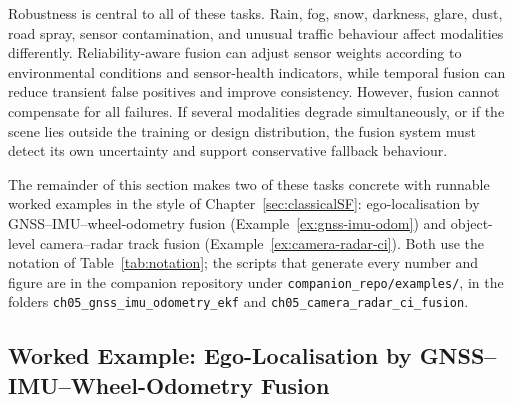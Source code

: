 \documentclass[graybox,envcountchap]{style/SNmono}
\newcommand{\repopath}[1]{\texttt{#1}}
\begin{document}
Robustness is central to all of these tasks. Rain, fog, snow, darkness, glare, dust, road spray, sensor contamination, and unusual traffic behaviour affect modalities differently. Reliability-aware fusion can adjust sensor weights according to environmental conditions and sensor-health indicators, while temporal fusion can reduce transient false positives and improve consistency. However, fusion cannot compensate for all failures. If several modalities degrade simultaneously, or if the scene lies outside the training or design distribution, the fusion system must detect its own uncertainty and support conservative fallback behaviour.

The remainder of this section makes two of these tasks concrete with runnable worked examples in the style of Chapter~\ref{sec:classicalSF}: ego-localisation by GNSS--IMU--wheel-odometry fusion (Example~\ref{ex:gnss-imu-odom}) and object-level camera--radar track fusion (Example~\ref{ex:camera-radar-ci}). Both use the notation of Table~\ref{tab:notation}; the scripts that generate every number and figure are in the companion repository under \repopath{companion\_\allowbreak repo/\allowbreak examples/\allowbreak }, in the folders \repopath{ch05\_\allowbreak gnss\_\allowbreak imu\_\allowbreak odometry\_\allowbreak ekf} and \repopath{ch05\_\allowbreak camera\_\allowbreak radar\_\allowbreak ci\_\allowbreak fusion}.

\subsection{Worked Example: Ego-Localisation by GNSS--IMU--Wheel-Odometry Fusion}
\label{subsec:ex-gnss}
\end{document}
